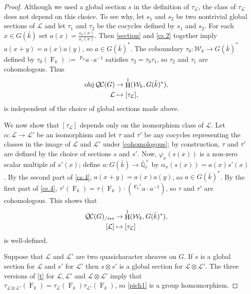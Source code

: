 \documentclass[11pt]{amsart}
\theoremstyle{plain}
\theoremstyle{definition}
\theoremstyle{remark}
\newcommand{\EE}{\mathbb{\bar Q}_\ell}
\newcommand{\bFq}{\bar{k}}
\newcommand{\Fq}{k}
\newcommand{\EEx}{\EE^\times}
\newcommand{\Frob}[1]{\operatorname{F}_{#1}}
\DeclareMathOperator{\Hh}{H}
\newcommand{\ceq}{{\, :=\, }}
\newcommand{\obj}{{\text{obj}\, }}
\newcommand{\qcs}[1]{{\mathcal{#1}}}
\newcommand{\QC}{{\mathcal{Q\hskip-0.8pt C}}}
\newcommand{\QCiso}[1]{\QC(#1)_{/\textit{iso}}}
\newcommand{\Weil}[1]{\mathcal{W}_{#1}}
\newcommand\Clifton[1]{\marginpar{\smaller\smaller CC: #1}}
\begin{document}
\begin{proof}
  Although we used a global section $s$ in the definition of
  $\tau_\qcs{L}$, the class of $\tau_\qcs{L}$ does not depend on this
  choice. To see why, let $s_1$ and $s_2$ be two nontrivial global sections of
  $\qcs{L}$ and let $\tau_1$ and $\tau_2$ be the cocycles defined by $s_1$ and $s_2$.
  For each $x \in G(\bFq)$ set $a(x) = \frac{s_2(x)}{s_1(x)}$.  Then \eqref{section} and
  \ref{cs.2} together imply $a(x+y) = a(x)a(y)$, so
  $a\in G(\bFq)^*$.  The coboundary $\tau_0 : \Weil{\Fq} \to G(\bFq)^*$
  defined by $\tau_0(\Frob{\Fq}) \ceq \,^{\Frob{\Fq}} a \cdot a^{-1}$ satisfies $\tau_2 = \tau_0 \tau_1$,
  so $\tau_2$ and $\tau_1$ are cohomologous. Thus
  \begin{equation}\label{cohomologous}
  \begin{split}
    \obj \QC(G) &\to \Hh^1(\Weil{\Fq},G(\bFq)^*), \\
    \qcs{L} &\mapsto [\tau_\qcs{L}],
  \end{split}
  \end{equation}
  is independent of the choice of global sections made above.

  We now show that $[\tau_\qcs{L}]$ depends only on the isomorphism class of $\qcs{L}$.
  Let $\alpha : \qcs{L} \to \qcs{L'}$ be an isomorphism and
  let $\tau$ and $\tau'$ be any cocycles representing the classes in the
  image of $\qcs{L}$ and $\qcs{L'}$ under \eqref{cohomologous}; by construction,
  $\tau$ and $\tau'$ are defined by the choice of sections $s$ and $s'$.
  Now, $\varphi_x(s(x))$ is a
  non-zero scalar multiple of $s'(x)$; define $a: G(\bFq) \to \EEx$
  by $\alpha_x(s(x)) = a(x) s'(x)$.
  By the second part of \ref{cs.4},
  $a(x+y) = a(x)a(y)$, so $a \in G(\bFq)^*$. By the first part of
  \ref{cs.4}, $\tau'(\Frob{\Fq}) = \tau(\Frob{\Fq}) \cdot (\,^{\Frob{\Fq}^{-1}}a \cdot a^{-1})$,
  so $\tau$ and $\tau'$ are cohomologous. This shows that
  \begin{equation}\label{pich1}
  \begin{split}
    \QCiso{G} &\to \Hh^1(\Weil{\Fq},G(\bFq)^*),\\
    [\qcs{L}] &\mapsto [\tau_\qcs{L}]
  \end{split}
  \end{equation}
  is well-defined.
  
    Suppose that $\qcs{L}$ and $\qcs{L}'$ are two quasicharacter sheaves on $G$.
  If $s$ is a global section for $\qcs{L}$ and $s'$ for $\qcs{L}'$ then $s \otimes s'$
  is a global section for $\qcs{L} \otimes\qcs{L}'$.  The three versions of \eqref{t}
  for $\qcs{L}, \qcs{L'}$ and $\qcs{L} \otimes\qcs{L}'$ imply that
  $\tau_{\qcs{L} \otimes\qcs{L}'}(\Frob{k}) = \tau_\qcs{L}(\Frob{k}) \tau_{\qcs{L}'}(\Frob{k})$,
  so \eqref{pich1} is a group homomorphism.
 

\end{proof}
\end{document}
